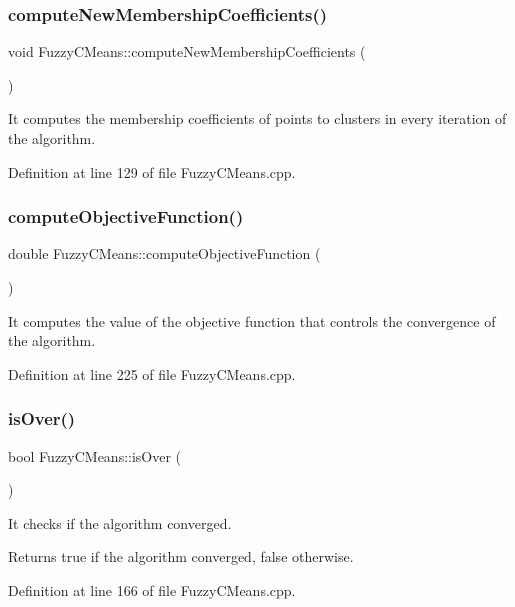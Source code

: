 \subsubsection{compute\+New\+Membership\+Coefficients()}
{\footnotesize\ttfamily void Fuzzy\+C\+Means\+::compute\+New\+Membership\+Coefficients (\begin{DoxyParamCaption}{ }\end{DoxyParamCaption})}

It computes the membership coefficients of points to clusters in every iteration of the algorithm. 

Definition at line 129 of file Fuzzy\+C\+Means.\+cpp.

\mbox{\label{class_fuzzy_c_means_a286c6b1a551e5c77422f40d3aacba856}} 
\subsubsection{compute\+Objective\+Function()}
{\footnotesize\ttfamily double Fuzzy\+C\+Means\+::compute\+Objective\+Function (\begin{DoxyParamCaption}{ }\end{DoxyParamCaption})}

It computes the value of the objective function that controls the convergence of the algorithm. 

Definition at line 225 of file Fuzzy\+C\+Means.\+cpp.

\mbox{\label{class_fuzzy_c_means_acd89ddb387a57ddc8838ed29c9ec31bd}} 
\subsubsection{is\+Over()}
{\footnotesize\ttfamily bool Fuzzy\+C\+Means\+::is\+Over (\begin{DoxyParamCaption}{ }\end{DoxyParamCaption})}

It checks if the algorithm converged. \begin{DoxyReturn}{Returns}
true if the algorithm converged, false otherwise. 
\end{DoxyReturn}


Definition at line 166 of file Fuzzy\+C\+Means.\+cpp.

